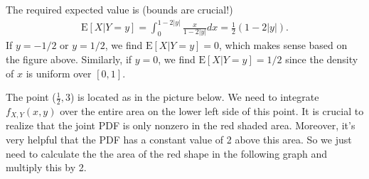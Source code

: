 \begin{exercise}
\begin{solution}
            The required expected value is (bounds are crucial!)
            \begin{align*}
                \text{E}[X|Y=y] = \int_{0}^{1-2|y|}\frac{x}{1-2|y|}dx = \frac{1}{2}(1-2|y|).
            \end{align*}
            If $y=-1/2$ or $y=1/2$, we find $\text{E}[X|Y=y]=0$, which makes sense based on the figure above. Similarly, if $y=0$, we find $\text{E}[X|Y=y] = 1/2$ since the density of $x$ is uniform over $[0,1]$.


            The point ($\frac{1}{2},3$) is located as in the picture below. We need to integrate $f_{X,Y}(x,y)$ over the entire area on the lower left side of this point. It is crucial to realize that the joint PDF is only nonzero in the red shaded area. Moreover, it's very helpful that the PDF has a constant value of 2 above this area.
            So we just need to calculate the the area of the red shape in the following graph and multiply this by 2.
            \begin{center}
\end{center}
\end{solution}
\end{exercise}

